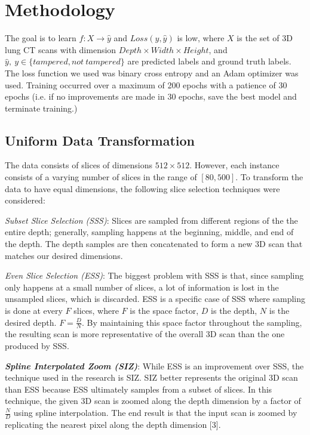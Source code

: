 \documentclass[conference]{IEEEtran}
\begin{document}
\section{\textbf{Methodology}}
The goal is to learn $f : X \longrightarrow \hat{y}$ and $Loss(y, \hat{y})$ is low, where $X$ is the set of 3D lung CT scans with dimension $Depth \times Width \times Height$, and $\hat{y},\ y \in \{tampered, not\ tampered\}$ are predicted labels and ground truth labels. The loss function we used was binary cross entropy and an Adam optimizer was used. Training occurred over a maximum of 200 epochs with a patience of 30 epochs (i.e. if no improvements are made in 30 epochs, save the best model and terminate training.)
\subsection{\textbf{Uniform Data Transformation}}
The data consists of slices of dimensions $512 \times 512$. However, each instance consists of a varying number of slices in the range of $[80, 500]$. To transform the data to have equal dimensions, the following slice selection techniques were considered:

\textit{Subset Slice Selection (SSS)}: Slices are sampled from different regions of the the entire depth; generally, sampling happens at the beginning, middle, and end of the depth. The depth samples are then concatenated to form a new 3D scan that matches our desired dimensions.

\textit{Even Slice Selection (ESS)}: The biggest problem with SSS is that, since sampling only happens at a small number of slices, a lot of information is lost in the unsampled slices, which is discarded. ESS is a specific case of SSS where sampling is done at every $F$ slices, where $F$ is the space factor, $D$ is the depth, $N$ is the desired depth. $F = \frac{D}{N}$. By maintaining this space factor throughout the sampling, the resulting scan is more representative of the overall 3D scan than the one produced by SSS.

\textbf{\textit{Spline Interpolated Zoom (SIZ)}}: While ESS is an improvement over SSS, the technique used in the research is SIZ. SIZ better represents the original 3D scan than ESS because ESS ultimately samples from a subset of slices. In this technique, the given 3D scan is zoomed along the depth dimension by a factor of $\frac{N}{D}$ using spline interpolation. The end result is that the input scan is zoomed by replicating the nearest pixel along the depth dimension [3].
\end{document}
